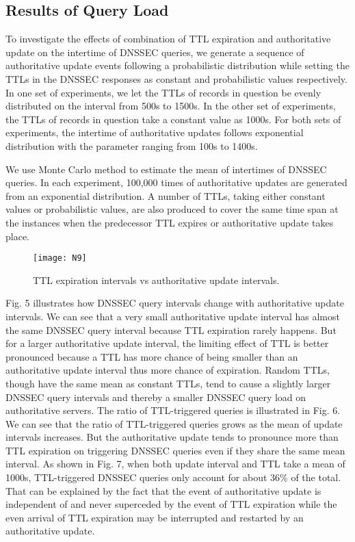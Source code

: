 \documentclass[conference]{IEEEtran}
\begin{document}
\subsection{Results of Query Load}

To investigate the effects of combination of TTL expiration and authoritative update on the intertime of DNSSEC queries, we generate a sequence of authoritative update events following a probabilistic distribution while setting the TTLs in the DNSSEC responses as constant and probabilistic values respectively. In one set of experiments, we let the TTLs of records in question be evenly distributed on the interval from 500s to 1500s. In the other set of experiments, the TTLs of records in question take a constant value as 1000s. For both sets of experiments, the intertime of authoritative updates follows exponential distribution with the parameter ranging from 100s to 1400s. 


We use Monte Carlo method to estimate the mean of intertimes of DNSSEC queries. In each experiment, 100,000 times of authoritative updates are generated from an exponential distribution. A number of TTLs, taking either constant values or probabilistic values, are also produced to cover the same time span at the instances when the predecessor TTL expires or authoritative update takes place.

\begin{figure}[!t]
\centering
{\texttt{[image: N9]}}
\caption{TTL expiration intervals vs authoritative update intervals.}
\vspace{-2em}
\end{figure}

Fig. 5 illustrates how DNSSEC query intervals change with authoritative update intervals. We can see that a very small authoritative update interval has almost the same DNSSEC query interval because TTL expiration rarely happens. But for a larger authoritative update interval, the limiting effect of TTL is better pronounced because a TTL has more chance of being smaller than an authoritative update interval thus more chance of expiration. Random TTLs, though have the same mean as constant TTLs, tend to cause a slightly larger DNSSEC query intervals and thereby a smaller DNSSEC query load on authoritative servers. The ratio of TTL-triggered queries is illustrated in Fig. 6.  We can see that the ratio of TTL-triggered queries grows as the mean of update intervals increases. But the authoritative update tends to pronounce more than TTL expiration on triggering DNSSEC queries even if they share the same mean interval. As shown in Fig. 7, when both update interval and TTL take a mean of 1000s,  TTL-triggered DNSSEC queries only account for about 36\% of the total. That can be explained by the fact that the event of authoritative update is independent of and never superceded by the event of TTL expiration while the even arrival of TTL expiration may be interrupted and restarted by an authoritative update.
\end{document}
